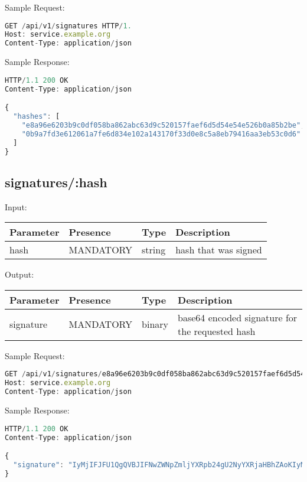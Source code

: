 Sample Request:

\begin{lstlisting}[caption={signatures request}, captionpos=b, language=JavaScript, label={lst:signaturesrequest}]
GET /api/v1/signatures HTTP/1.
Host: service.example.org
Content-Type: application/json
\end{lstlisting}

Sample Response:

\begin{lstlisting}[caption={signatures response}, captionpos=b, language=JavaScript, label={lst:signaturesresponse}]
HTTP/1.1 200 OK
Content-Type: application/json

{
  "hashes": [
    "e8a96e6203b9c0df058ba862abc63d9c520157faef6d5d54e54e526b0a85b2be",
    "0b9a7fd3e612061a7fe6d834e102a143170f33d0e8c5a8eb79416aa3eb53c0d6"
  ]
}
\end{lstlisting}

\subsection{signatures/:hash}
Input:

\begin{tabular}{|l|l|l|l|}
	\hline
	Parameter & Presence & Type & Description \\ \hline
	hash & MANDATORY & string & hash that was signed \\ \hline
\end{tabular}

Output:

\begin{tabular}{|l|l|l|l|}
	\hline
	Parameter & Presence & Type & Description \\ \hline
	signature & MANDATORY & binary & base64 encoded signature for the requested hash \\ \hline
\end{tabular}

Sample Request:

\begin{lstlisting}[caption={signature request}, captionpos=b, language=JavaScript, label={lst:signaturerequest}]
GET /api/v1/signatures/e8a96e6203b9c0df058ba862abc63d9c520157faef6d5d54e54e526b0a85b2be HTTP/1.
Host: service.example.org
Content-Type: application/json
\end{lstlisting}

Sample Response:

\begin{lstlisting}[caption={signature response}, captionpos=b, language=JavaScript, label={lst:signatureresponse}]
HTTP/1.1 200 OK
Content-Type: application/json

{
  "signature": "IyMjIFJFU1QgQVBJIFNwZWNpZmljYXRpb24gU2NyYXRjaHBhZAoKIyMjIyBQcmUtQXV0aCBlbmRw...b2ludCAKIyMjIyMgRW5kcG9pbnQKYGBgUE9TVCAvYXBpL3YxL3NpZ25gYGAK"
}
\end{lstlisting}

